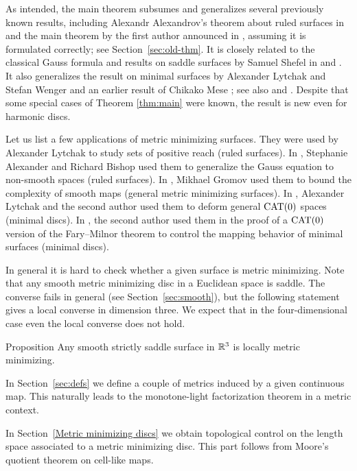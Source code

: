 \documentclass{article}
\begin{document}
As intended, the main theorem subsumes and generalizes several previously known results, including Alexandr Alexandrov's theorem about ruled surfaces in \cite{A} and 
the main theorem by the first author announced in \cite{petrunin-metric-min}, assuming it is formulated correctly; see Section~\ref{sec:old-thm}. 
It is closely related to the classical Gauss formula and results on saddle surfaces by Samuel Shefel in \cite{shefel-2D} and \cite{shefel-3D}.
It also generalizes the result on minimal surfaces by Alexander Lytchak and Stefan Wenger 
\cite[Theorem 1.2]{LW5}  and an earlier result of Chikako Mese \cite{mese};
see also \cite[Chapter 4]{akp} and \cite{petrunin-stadler}. 
Despite that some special cases of Theorem \ref{thm:main} were known, the result is new even for harmonic discs.

Let us list a few applications of metric minimizing surfaces.
They were used by Alexander Lytchak \cite{L} to study sets of positive reach (ruled surfaces).
In  \cite{AB}, Stephanie Alexander and Richard Bishop used them to generalize the Gauss equation to non-smooth spaces (ruled surfaces).
In \cite{G}, Mikhael Gromov used them to bound the complexity of smooth maps (general metric minimizing surfaces).
In \cite{LS}, Alexander Lytchak and the second author used them to deform general $\mathop{\rm CAT}\nolimits(0)$ spaces (minimal discs).
In \cite{St}, the second author used them in the proof of a $\mathop{\rm CAT}\nolimits(0)$ version of the Fary--Milnor theorem to control the mapping behavior of minimal surfaces (minimal discs).  

In general it is hard to check whether a given surface is metric minimizing.
Note that any smooth metric minimizing disc in a Euclidean space is saddle.
The converse fails in general (see Section~\ref{sec:smooth}), but the following statement gives a local converse in dimension three.
We expect that in the four-dimensional case even the local converse does not hold.

\begin{thm}{Proposition}\label{prop:smooth}
Any smooth strictly saddle surface in $\mathbb{R}^3$ is locally metric minimizing.
\end{thm}
 


In Section~\ref{sec:defs} we define a couple of metrics induced by a given continuous map.
This naturally leads to the monotone-light factorization theorem in a metric context.
 
In Section~\ref{Metric minimizing discs} we obtain topological control on the length space
associated to a metric minimizing disc. 
This part follows from Moore's quotient theorem on cell-like maps.
 
\end{document}
